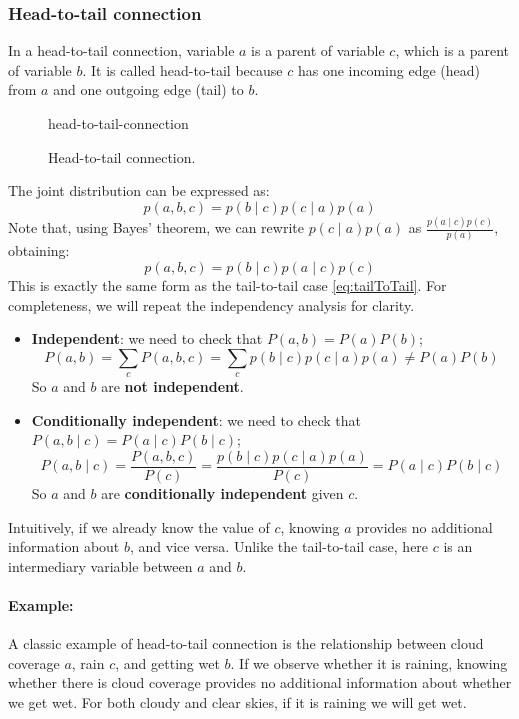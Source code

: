 \subsubsection{Head-to-tail connection}
In a head-to-tail connection, variable $a$ is a parent of variable $c$, which is a parent of variable $b$.
It is called head-to-tail because $c$ has one incoming edge (head) from $a$ and one outgoing edge (tail) to $b$.
\begin{figure}[H]
\centering
    {head-to-tail-connection}
    \caption{Head-to-tail connection.}
\end{figure}
The joint distribution can be expressed as:
\[ p(a,b,c) = p(b \mid c) p(c \mid a) p(a) \]
Note that, using Bayes' theorem, we can rewrite $p(c \mid a) p(a)$ as $\frac{p(a \mid c) p(c)}{p(a)}$, obtaining:
\[ p(a,b,c) = p(b \mid c) p(a \mid c) p(c) \]
This is exactly the same form as the tail-to-tail case \ref{eq:tailToTail}.
For completeness, we will repeat the independency analysis for clarity.
\begin{itemize}
    \item \textbf{Independent}: we need to check that $P(a, b) = P(a) P(b)$;
    \[ P(a, b) = \sum_{c} P(a, b, c) = \sum_{c} p(b \mid c) p(c \mid a) p(a) \neq P(a) P(b)\]
    So $a$ and $b$ are \textbf{not independent}.
    \item \textbf{Conditionally independent}: we need to check that $P(a, b \mid c) = P(a \mid c) P(b \mid c)$;
    \[ P(a, b \mid c) = \frac{P(a, b, c)}{P(c)} = \frac{p(b \mid c) p(c \mid a) p(a)}{P(c)} = P(a \mid c) P(b \mid c) \]
    So $a$ and $b$ are \textbf{conditionally independent} given $c$.
\end{itemize}
Intuitively, if we already know the value of $c$, knowing $a$ provides no additional information about $b$, and vice versa.
Unlike the tail-to-tail case, here $c$ is an intermediary variable between $a$ and $b$.
\paragraph{Example:}
A classic example of head-to-tail connection is the relationship between cloud coverage $a$, rain $c$, and getting wet $b$.
If we observe whether it is raining, knowing whether there is cloud coverage provides no additional 
information about whether we get wet. For both cloudy and clear skies, if it is raining we will get wet.

